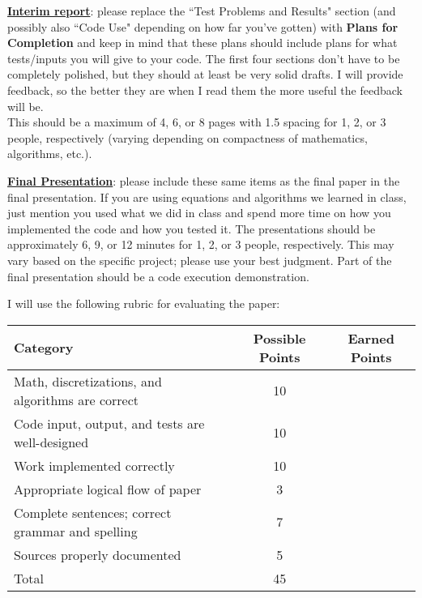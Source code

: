 \documentclass[a4paper, 12 pt]{curve}
\begin{document}
\vspace*{2em}
\underline{\textbf{Interim report}}: please replace the ``Test Problems and Results" section (and possibly also ``Code Use" depending on how far you've gotten) with \textbf{Plans for Completion} and keep in mind that these plans should include plans for what tests/inputs you will give to your code. The first four sections don't have to be completely polished, but they should at least be very solid drafts. I will provide feedback, so the better they are when I read them the more useful the feedback will be. 
\vspace*{1em}\\
This should be a maximum of 4, 6, or 8 pages with 1.5 spacing for 1, 2, or 3 people, respectively (varying depending on compactness of mathematics, algorithms, etc.).

\vspace*{2em}
\underline{\textbf{Final Presentation}}: please include these same items as the final paper in the final presentation. If you are using equations and algorithms we learned in class, just mention you used what we did in class and spend more time on how you implemented the code and how you tested it. The presentations should be approximately 6, 9, or 12 minutes for 1, 2, or 3 people, respectively.  This may vary based on the specific project; please use your best judgment. Part of the final presentation should be a code execution demonstration.

\vspace*{2em}


\vspace*{2em}
I will use the following rubric for evaluating the paper:
\begin{center}
\begin{tabu}{| X | c | c |}\hline
\textbf{Category} & \textbf{Possible Points} & \textbf{Earned Points} \\ \hline \hline
Math, discretizations, and algorithms are correct & 10 & \\ \hline
Code input, output, and tests are well-designed & 10 & \\ \hline
Work implemented correctly & 10 & \\ \hline
Appropriate logical flow of paper & 3 & \\ \hline
Complete sentences; correct grammar and spelling & 7 & \\ \hline
Sources properly documented & 5 & \\ \hline
Total & 45 & \\\hline
\end{tabu} 
\end{center}
\end{document}
